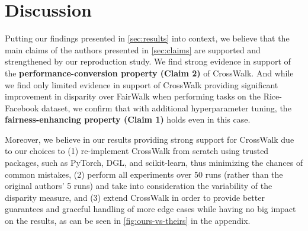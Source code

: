 \section{Discussion}
\label{sec:discussion}


Putting our findings presented in \autoref{sec:results} into context, we believe that the main claims of the authors presented in \autoref{sec:claims} are supported and strengthened by our reproduction study. We find strong evidence in support of the \textbf{performance-conversion property (Claim 2)} of CrossWalk. And while we find only limited evidence in support of CrossWalk providing significant improvement in disparity over FairWalk when performing tasks on the Rice-Facebook dataset, we confirm that with additional hyperparameter tuning, the \textbf{fairness-enhancing property (Claim 1)} holds even in this case.

Moreover, we believe in our results providing strong support for CrossWalk due to our choices to (1) re-implement CrossWalk from scratch using trusted packages, such as PyTorch, DGL, and scikit-learn, thus minimizing the chances of common mistakes, (2) perform all experiments over 50 runs (rather than the original authors' 5 runs) and take into consideration the variability of the disparity measure, and (3) extend CrossWalk in order to provide better guarantees and graceful handling of more edge cases while having no big impact on the results, as can be seen in \autoref{fig:ours-vs-theirs} in the appendix.


